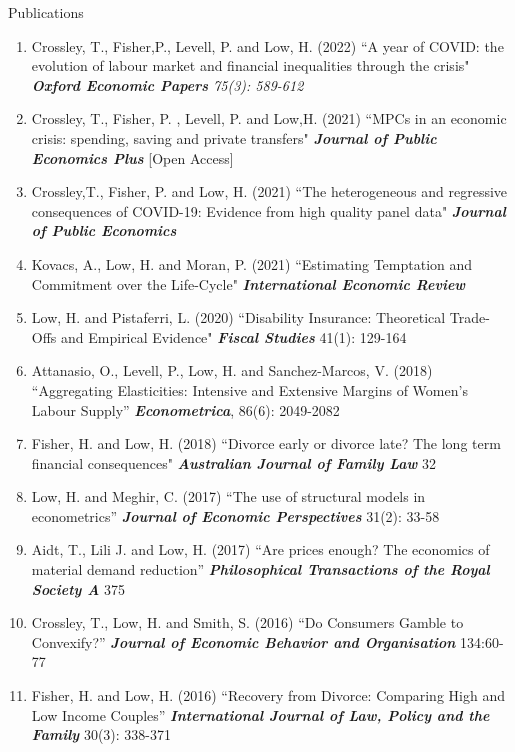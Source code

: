 \documentclass{resume} %
\begin{document}
\begin{rSection}{Publications}
\begin{enumerate}
\item Crossley, T., Fisher,P., Levell, P. and Low, H. (2022) ``A year of COVID: the evolution of labour market and financial inequalities through the crisis"  \textit{\textbf{Oxford Economic Papers} 75(3): 589-612}

\item Crossley, T., Fisher, P. , Levell, P. and Low,H. (2021)  ``MPCs in an economic crisis: spending, saving and private transfers" \textit{\textbf{Journal of Public Economics Plus}} [Open Access] 
\item Crossley,T., Fisher, P. and Low, H. (2021) ``The heterogeneous and regressive consequences of COVID-19: Evidence from high quality panel data" \textit{\textbf{Journal of Public Economics}} 
\item Kovacs, A., Low, H. and Moran, P. (2021) ``Estimating Temptation and Commitment over the Life-Cycle"  \textit{\textbf{International 
Economic Review}}

\item Low, H. and Pistaferri, L. (2020) ``Disability Insurance: Theoretical Trade-Offs and Empirical Evidence" \textit{\textbf{Fiscal Studies}} 41(1): 129-164

\item Attanasio, O., Levell, P., Low, H. and Sanchez-Marcos, V. (2018) ``Aggregating Elasticities: Intensive and Extensive Margins of Women's Labour Supply” \textit{\textbf{Econometrica}}, 86(6): 2049-2082

\item Fisher, H. and Low, H. (2018) ``Divorce early or divorce late? The long term financial consequences" \textit{\textbf{Australian Journal of Family Law}} 32

\item Low, H. and Meghir, C. (2017) ``The use of structural models in econometrics” \textit{\textbf{Journal of Economic Perspectives}} 31(2): 33-58
\item Aidt, T., Lili J. and Low, H. (2017) ``Are prices enough? The economics of material demand reduction” \textit{\textbf{Philosophical Transactions of the Royal Society A}} 375

\item Crossley, T., Low, H. and Smith, S. (2016) ``Do Consumers Gamble to Convexify?” \textit{\textbf{Journal of Economic Behavior and Organisation}} 134:60-77

\item Fisher, H. and Low, H. (2016) ``Recovery from Divorce: Comparing High and Low Income Couples” \textit{\textbf{International Journal of Law, Policy and the Family}} 30(3): 338-371


\end{enumerate}
\end{rSection}
\end{document}
